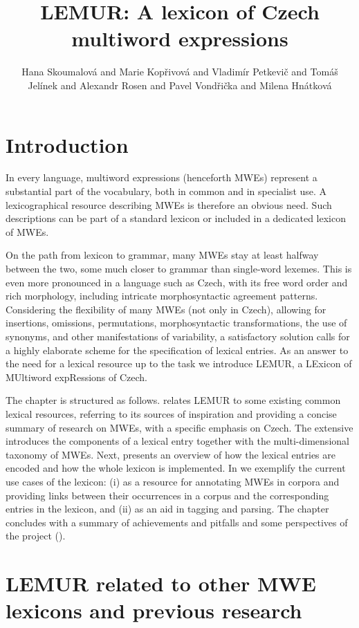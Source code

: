 \documentclass[output=paper,colorlinks,citecolor=brown]{langscibook}
\author{Hana Skoumalová\orcid{0000-0002-3519-0233}\affiliation{Charles University} and Marie Kopřivová\orcid{0000-0001-7390-0753}\affiliation{Charles University} and Vladimír Petkevič\orcid{0000-0003-0468-4158}\affiliation{Charles University} and Tomáš Jelínek\orcid{0000-0002-8521-4715}\affiliation{Charles University} and Alexandr Rosen\orcid{0000-0003-2210-4268}\affiliation{Charles University} and Pavel Vondřička\orcid{0000-0001-8544-6113}\affiliation{Charles University} and Milena Hnátková\orcid{0000-0002-4790-9807}\affiliation{Charles University}}
\title{LEMUR: A lexicon of Czech multiword expressions}
\begin{document}
\maketitle


\section{Introduction}
\label{sec:intro}

In every language, multiword expressions (henceforth MWEs) represent a substantial part of the vocabulary, both in common and in specialist use. A lexicographical resource describing MWEs is therefore an obvious need. Such descriptions can be part of a standard lexicon or included in a dedicated lexicon of MWEs. 

On the path from lexicon to grammar, many MWEs stay at least halfway between the two, some much closer to grammar than single-word lexemes. This is even more pronounced in a language such as Czech, with its free word order and rich morphology, including intricate morphosyntactic agreement patterns. Considering the flexibility of many MWEs (not only in Czech), allowing for insertions, omissions, permutations, morphosyntactic transformations, the use of synonyms, and other manifestations of variability, a satisfactory solution calls for a highly elaborate scheme for the specification of lexical entries.
As an answer to the need for a lexical resource up to the task we introduce LEMUR, a LExicon of MUltiword expRessions of Czech.

The chapter is structured as follows.  relates LEMUR to some existing common lexical resources, referring to its sources of inspiration and providing a concise summary of research on MWEs, with a specific emphasis on Czech. The extensive  introduces the components of a lexical entry together with the multi-dimensional taxonomy of MWEs. Next,  presents an overview of how the lexical entries are encoded and how the whole lexicon is implemented. In  we exemplify the current use cases of the lexicon: (i) as a resource for annotating MWEs in corpora and providing links between their occurrences in a corpus and the corresponding entries in the lexicon, and (ii) as an aid in tagging and parsing. The chapter concludes with a summary of achievements and pitfalls and some perspectives of the project ().

\section{LEMUR related to other MWE lexicons and previous research}
\label{sec:previous-work}
\end{document}

